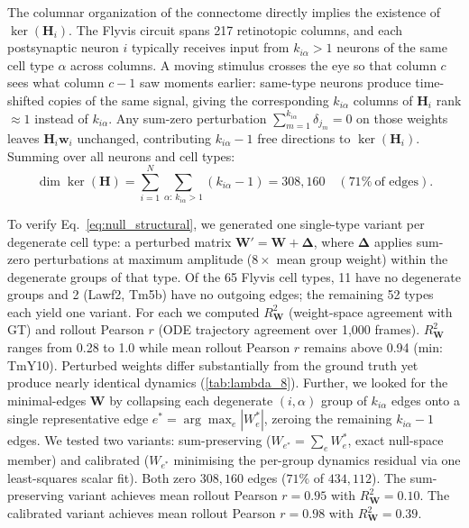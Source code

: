 \documentclass{article}
\begin{document}
The columnar organization of the connectome directly implies the
existence of $\ker(\mathbf{H}_i)$. The Flyvis circuit
spans 217 retinotopic columns, and each postsynaptic neuron $i$ typically
receives input from $k_{i\alpha} > 1$ neurons of the same cell type $\alpha$
across columns. A moving stimulus crosses the eye so that column $c$ sees
what column $c-1$ saw moments earlier: same-type neurons produce time-shifted
copies of the same signal, giving the corresponding $k_{i\alpha}$ columns of
$\mathbf{H}_i$ rank $\approx 1$ instead of $k_{i\alpha}$. Any sum-zero
perturbation $\sum_{m=1}^{k_{i\alpha}} \delta_{j_m} = 0$ on those weights
leaves $\mathbf{H}_i \mathbf{w}_i$ unchanged, contributing $k_{i\alpha} - 1$
free directions to $\ker(\mathbf{H}_i)$. Summing over all neurons and cell
types:
\begin{equation}
  \dim\ker(\mathbf{H}) = \sum_{i=1}^{N}\sum_{\alpha:\,k_{i\alpha}>1}(k_{i\alpha}-1)
  = 308{,}160 \quad (71\%\ \text{of edges}).
  \label{eq:null_structural}
\end{equation}

To verify Eq.~\eqref{eq:null_structural}, we generated one single-type variant
per degenerate cell type: a perturbed matrix $\mathbf{W}' = \mathbf{W} +
\boldsymbol{\Delta}$, where $\boldsymbol{\Delta}$ applies sum-zero perturbations
at maximum amplitude ($8\times$ mean group weight) within the degenerate groups
of that type. Of the 65 Flyvis cell types, 11 have no degenerate groups and 2
(Lawf2, Tm5b) have no outgoing edges; the remaining 52 types each yield one
variant. For each we computed $R^2_{\mathbf{W}}$ (weight-space agreement with GT)
and rollout Pearson $r$ (ODE trajectory agreement over 1{,}000 frames).
$R^2_{\mathbf{W}}$ ranges from 0.28 to 1.0 while mean rollout Pearson $r$ remains
above 0.94 (min: TmY10). Perturbed weights differ substantially from the ground
truth yet produce nearly identical dynamics (\cref{tab:lambda_8}). Further, we looked for the minimal-edges $\mathbf{W}$ by collapsing each degenerate $(i,\alpha)$ group of $k_{i\alpha}$ edges onto a
single representative edge $e^* = \arg\max_e |W_e^*|$, zeroing the remaining
$k_{i\alpha}-1$ edges. We tested two variants: sum-preserving
($W_{e^*} = \sum_e W_e^*$, exact null-space member) and calibrated
($W_{e^*}$ minimising the per-group dynamics residual via one least-squares
scalar fit). Both zero $308{,}160$ edges ($71\%$ of $434{,}112$). The sum-preserving variant achieves mean rollout Pearson $r = 0.95$ with $R^2_{\mathbf{W}} = 0.10$.
The calibrated variant achieves mean rollout Pearson $r = 0.98$ with $R^2_{\mathbf{W}} = 0.39$.
\end{document}

